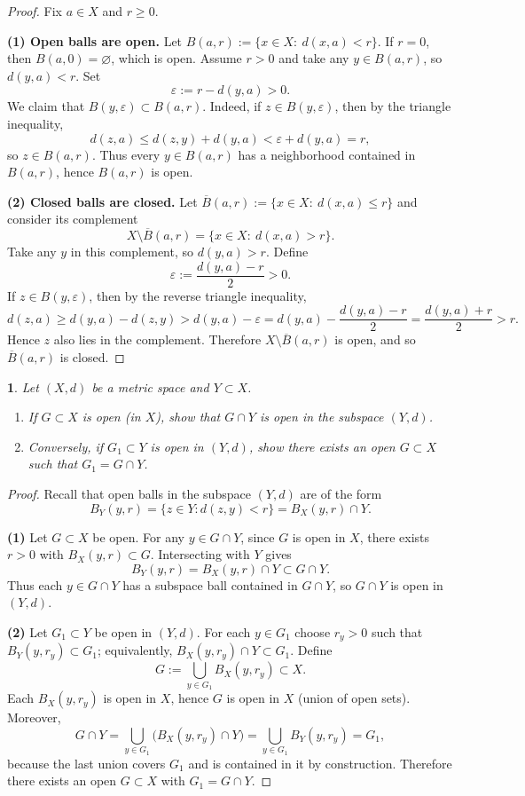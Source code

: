 \documentclass[12pt, a4paper]{report}
\theoremstyle{spaced}
\newtheorem{exercise}{}
\newcommand{\setexercise}[1]{\setcounter{exercise}{#1-1}}
\begin{document}
\begin{proof}
	Fix $a\in X$ and $r\ge 0$.

	\medskip
	\noindent\textbf{(1) Open balls are open.}
	Let $B(a,r):=\{x\in X:\ d(x,a)<r\}$.
	If $r=0$, then $B(a,0)=\varnothing$, which is open.
	Assume $r>0$ and take any $y\in B(a,r)$, so $d(y,a)<r$.
	Set
	\[
		\varepsilon:=r-d(y,a)>0.
	\]
	We claim that $B(y,\varepsilon)\subset B(a,r)$.
	Indeed, if $z\in B(y,\varepsilon)$, then by the triangle inequality,
	\[
		d(z,a)\le d(z,y)+d(y,a)<\varepsilon+d(y,a)=r,
	\]
	so $z\in B(a,r)$. Thus every $y\in B(a,r)$ has a neighborhood contained in $B(a,r)$,
	hence $B(a,r)$ is open.

	\medskip
	\noindent\textbf{(2) Closed balls are closed.}
	Let $\overline{B}(a,r):=\{x\in X:\ d(x,a)\le r\}$ and consider its complement
	\[
		X\setminus \overline{B}(a,r)=\{x\in X:\ d(x,a)>r\}.
	\]
	Take any $y$ in this complement, so $d(y,a)>r$.  Define
	\[
		\varepsilon:=\frac{d(y,a)-r}{2}>0.
	\]
	If $z\in B(y,\varepsilon)$, then by the reverse triangle inequality,
	\[
		d(z,a)\ge d(y,a)-d(z,y)> d(y,a)-\varepsilon
		= d(y,a)-\frac{d(y,a)-r}{2}=\frac{d(y,a)+r}{2}>r.
	\]
	Hence $z$ also lies in the complement. Therefore $X\setminus \overline{B}(a,r)$ is open,
	and so $\overline{B}(a,r)$ is closed.
\end{proof}
\setexercise{8}

\begin{exercise}
	Let $(X,d)$ be a metric space and $Y\subset X$.
	\begin{enumerate}
		\item If $G\subset X$ is open (in $X$), show that $G\cap Y$ is open in the subspace $(Y,d)$.
		\item Conversely, if $G_1\subset Y$ is open in $(Y,d)$, show there exists an open $G\subset X$ such that
		      $G_1=G\cap Y$.
	\end{enumerate}
\end{exercise}

\begin{proof}
	Recall that open balls in the subspace $(Y,d)$ are of the form
	\[
		B_Y(y,r)=\{z\in Y: d(z,y)<r\}=B_X(y,r)\cap Y.
	\]

	\textbf{(1)} Let $G\subset X$ be open. For any $y\in G\cap Y$, since $G$ is open in $X$, there exists $r>0$
	with $B_X(y,r)\subset G$. Intersecting with $Y$ gives
	\[
		B_Y(y,r)=B_X(y,r)\cap Y\subset G\cap Y.
	\]
	Thus each $y\in G\cap Y$ has a subspace ball contained in $G\cap Y$, so $G\cap Y$ is open in $(Y,d)$.

	\medskip
	\textbf{(2)} Let $G_1\subset Y$ be open in $(Y,d)$. For each $y\in G_1$ choose $r_y>0$ such that
	$B_Y(y,r_y)\subset G_1$; equivalently, $B_X(y,r_y)\cap Y\subset G_1$.
	Define
	\[
		G:=\bigcup_{y\in G_1} B_X(y,r_y)\subset X.
	\]
	Each $B_X(y,r_y)$ is open in $X$, hence $G$ is open in $X$ (union of open sets). Moreover,
	\[
		G\cap Y=\bigcup_{y\in G_1}\bigl(B_X(y,r_y)\cap Y\bigr)
		=\bigcup_{y\in G_1} B_Y(y,r_y)=G_1,
	\]
	because the last union covers $G_1$ and is contained in it by construction. Therefore there exists
	an open $G\subset X$ with $G_1=G\cap Y$.
\end{proof}
\end{document}
